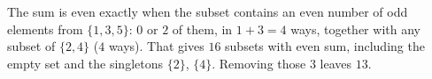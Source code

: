 The sum is even exactly when the subset contains an even number of odd elements from $\{1,3,5\}$: $0$ or $2$ of them, in $1+3=4$ ways, together with any subset of $\{2,4\}$ ($4$ ways). That gives $16$ subsets with even sum, including the empty set and the singletons $\{2\}$, $\{4\}$. Removing those $3$ leaves $\boxed{13}$.
